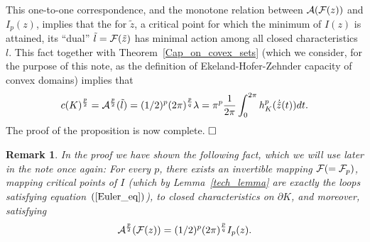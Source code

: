 \documentclass[12pt]{article}
\newtheorem{remark}[lemma]{Remark}
\begin{document}
This one-to-one correspondence, and the monotone relation between
${\cal A}({\cal F}(z))$ and $I_p(z)$, implies that the for $\tilde z$,
a critical point for which the minimum of $I(z)$ is attained, its
``dual'' $\tilde l = {\cal F}(\tilde{z})  $ has minimal
 action among all closed characteristics $l$.
This fact together with Theorem~\ref{Cap_on_covex_sets} (which we
consider, for the purpose of this note, as the definition of
Ekeland-Hofer-Zehnder capacity of convex domains) implies that
%
\begin{equation}\label{givemeaname}
c(K)^{\frac p 2} = {\cal A}^{\frac p 2} (\tilde l) =
 ({1/2})^{p } (2 \pi)^{\frac p q} \lambda = \pi^p {\frac 1 {2 \pi}}
 \int_0^{2 \pi} h_K^p( {\dot {\tilde z}}(t))dt. \end{equation}
The proof of the proposition is now complete. $\hfill \square$



\begin{remark}\label{theFremark} {\rm
In the proof we have shown the following fact, which we will use
later in the note once again: For every $p$, there exists an
invertible mapping ${\cal F} ( = {\cal F}_{p})$, mapping critical
points of $I$ (which by Lemma~\ref{tech_lemma} are exactly the loops
satisfying equation~$(\ref{Euler_eq})$), to closed characteristics
on $\partial K$, and moreover, satisfying
\begin{equation}
{\cal A}^{\frac p 2} ({\cal F}(z)) = ({1/2})^{p } (2 \pi)^{\frac p
q} I_p(z).
\end{equation} }
\end{remark}
\end{document}
